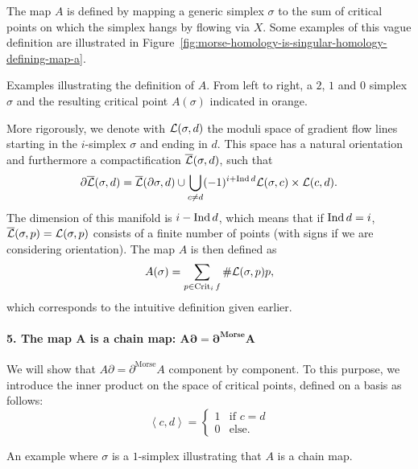 \begin{myproof}
    The map $A$ is defined by mapping a generic simplex $\sigma$ to the sum of critical points on which the simplex hangs by flowing via $X$.
    Some examples of this vague definition are illustrated in Figure~\ref{fig:morse-homology-is-singular-homology-defining-map-a}.
    \begin{marginfigure}
        \centering
        \caption{
            Examples illustrating the definition of $A$.
            From left to right, a $2$, $1$ and  $0$ simplex $\sigma$ and the resulting critical point $A(\sigma)$ indicated in orange.
        }
        \label{fig:morse-homology-is-singular-homology-defining-map-a}
    \end{marginfigure}
    More rigorously, we denote with $\mathcal L(\sigma, d)$ the moduli space of gradient flow lines starting in the $i$-simplex $\sigma$ and ending in $d$.
    This space has a natural orientation and furthermore a compactification $\overline{\mathcal L}(\sigma, d)$, such that
    \[
    \partial \overline{\mathcal L}(\sigma, d) = \overline{\mathcal L}(\partial \sigma, d) \cup \bigcup_{c \neq d}  (-1)^{i + \operatorname{Ind} d} \mathcal L(\sigma, c) \times \mathcal L(c, d)
    .\] 
    The dimension of this manifold is $i - \operatorname{Ind} d$, which means that if  $\operatorname{Ind} d = i$,  $\overline{\mathcal L}(\sigma, p) = \mathcal L(\sigma, p)$ consists of a finite number of points (with signs if we are considering orientation).
    The map $A$ is then defined as
    \[
        A(\sigma) = \sum_{p \in \operatorname{Crit}_i f} \# \mathcal L(\sigma, p) p
    ,\] 
    which corresponds to the intuitive definition given earlier.


    \paragraph{5. The map  $\bm A$ is a chain map:  $\bm{A \partial = \partial^{\text{Morse}} A}$}
    We will show that $A \partial = \partial^{\text{Morse}} A$ component by component. To this purpose, we introduce the inner product on the space of critical points, defined on a basis as follows:
    \[
        \left<c, d \right> = \begin{cases}
            1 & \text{if $c = d$}\\
            0 & \text{else.}
        \end{cases}
    \] 
\begin{marginfigure}
    \centering
    \caption{An example where $\sigma$ is a $1$-simplex illustrating that  $A$ is a chain map.}
    \label{fig:a-is-a-chain-map}
\end{marginfigure}


\end{myproof}
